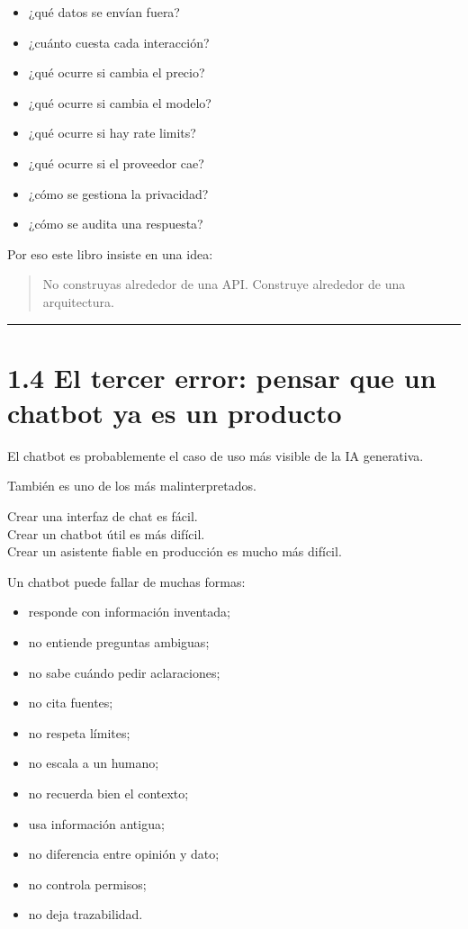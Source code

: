 \begin{itemize}
\tightlist
\item
  ¿qué datos se envían fuera?
\item
  ¿cuánto cuesta cada interacción?
\item
  ¿qué ocurre si cambia el precio?
\item
  ¿qué ocurre si cambia el modelo?
\item
  ¿qué ocurre si hay rate limits?
\item
  ¿qué ocurre si el proveedor cae?
\item
  ¿cómo se gestiona la privacidad?
\item
  ¿cómo se audita una respuesta?
\end{itemize}

Por eso este libro insiste en una idea:

\begin{quote}
No construyas alrededor de una API. Construye alrededor de una
arquitectura.
\end{quote}

\begin{center}\rule{0.5\linewidth}{0.5pt}\end{center}

\section{1.4 El tercer error: pensar que un chatbot ya es un
producto}\label{el-tercer-error-pensar-que-un-chatbot-ya-es-un-producto}

El chatbot es probablemente el caso de uso más visible de la IA
generativa.

También es uno de los más malinterpretados.

Crear una interfaz de chat es fácil.\\
Crear un chatbot útil es más difícil.\\
Crear un asistente fiable en producción es mucho más difícil.

Un chatbot puede fallar de muchas formas:

\begin{itemize}
\tightlist
\item
  responde con información inventada;
\item
  no entiende preguntas ambiguas;
\item
  no sabe cuándo pedir aclaraciones;
\item
  no cita fuentes;
\item
  no respeta límites;
\item
  no escala a un humano;
\item
  no recuerda bien el contexto;
\item
  usa información antigua;
\item
  no diferencia entre opinión y dato;
\item
  no controla permisos;
\item
  no deja trazabilidad.
\end{itemize}

